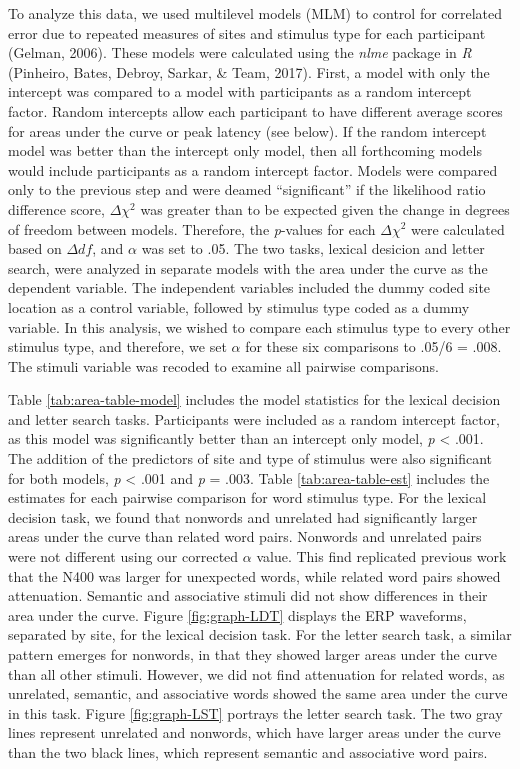 \documentclass[english,man]{apa6}
\theoremstyle{definition}
\theoremstyle{definition}
\theoremstyle{definition}
\theoremstyle{remark}
\begin{document}
To analyze this data, we used multilevel models (MLM) to control for
correlated error due to repeated measures of sites and stimulus type for
each participant (Gelman, 2006). These models were calculated using the
\emph{nlme} package in \emph{R} (Pinheiro, Bates, Debroy, Sarkar, \&
Team, 2017). First, a model with only the intercept was compared to a
model with participants as a random intercept factor. Random intercepts
allow each participant to have different average scores for areas under
the curve or peak latency (see below). If the random intercept model was
better than the intercept only model, then all forthcoming models would
include participants as a random intercept factor. Models were compared
only to the previous step and were deamed \enquote{significant} if the
likelihood ratio difference score, \(\Delta\chi^2\) was greater than to
be expected given the change in degrees of freedom between models.
Therefore, the \emph{p}-values for each \(\Delta\chi^2\) were calculated
based on \(\Delta df\), and \(\alpha\) was set to .05. The two tasks,
lexical desicion and letter search, were analyzed in separate models
with the area under the curve as the dependent variable. The independent
variables included the dummy coded site location as a control variable,
followed by stimulus type coded as a dummy variable. In this analysis,
we wished to compare each stimulus type to every other stimulus type,
and therefore, we set \(\alpha\) for these six comparisons to .05/6 =
.008. The stimuli variable was recoded to examine all pairwise
comparisons.

Table \ref{tab:area-table-model} includes the model statistics for the
lexical decision and letter search tasks. Participants were included as
a random intercept factor, as this model was significantly better than
an intercept only model, \emph{p} \textless{} .001. The addition of the
predictors of site and type of stimulus were also significant for both
models, \emph{p} \textless{} .001 and \emph{p} = .003. Table
\ref{tab:area-table-est} includes the estimates for each pairwise
comparison for word stimulus type. For the lexical decision task, we
found that nonwords and unrelated had significantly larger areas under
the curve than related word pairs. Nonwords and unrelated pairs were not
different using our corrected \(\alpha\) value. This find replicated
previous work that the N400 was larger for unexpected words, while
related word pairs showed attenuation. Semantic and associative stimuli
did not show differences in their area under the curve. Figure
\ref{fig:graph-LDT} displays the ERP waveforms, separated by site, for
the lexical decision task. For the letter search task, a similar pattern
emerges for nonwords, in that they showed larger areas under the curve
than all other stimuli. However, we did not find attenuation for related
words, as unrelated, semantic, and associative words showed the same
area under the curve in this task. Figure \ref{fig:graph-LST} portrays
the letter search task. The two gray lines represent unrelated and
nonwords, which have larger areas under the curve than the two black
lines, which represent semantic and associative word pairs.
\end{document}

